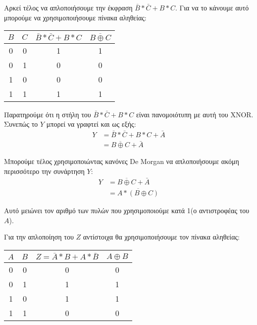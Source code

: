 \documentclass[]{article}
\begin{document}
Αρκεί τέλος να απλοποιήσουμε την έκφραση $\bar{B} * \bar{C} + B * C$. Για να το κάνουμε αυτό μπορούμε να χρησιμοποιήσουμε πίνακα αληθείας:
\begin{center}
	\begin{tabular} {|c|c|c|c|}
		\hline \rule{0pt}{11pt}$B$ & $C$ & $\bar{B} * \bar{C} + B * C$ & $\overline{B \oplus C}$ \\
		\hline 0                   & 0   & 1                           & 1                       \\
		0                          & 1   & 0                           & 0                       \\
		1                          & 0   & 0                           & 0                       \\
		1                          & 1   & 1                           & 1                       \\
		\hline
	\end{tabular}
\end{center}

Παρατηρούμε ότι η στήλη του $\bar{B} * \bar{C} + B * C$ είναι πανομοιότυπη με αυτή του XNOR. Συνεπώς το $Y$ μπορεί να γραφτεί και ως εξής:
\begin{align*}
	Y & = \bar{B} * \bar{C} + B * C + \bar{A} \\
	  & = \overline{B \oplus C} + \bar{A}
\end{align*}

Μπορούμε τέλος χρησιμοποιώντας κανόνες De Morgan να απλοποιήσουμε ακόμη περισσότερο την συνάρτηση $Y$:
\begin{align*}
	Y & = \overline{B \oplus C} + \bar{A} \\
	  & = \overline{A * (B \oplus C)}
\end{align*}

Αυτό μειώνει τον αριθμό των πυλών που χρησιμοποιούμε κατά 1(ο αντιστροφέας του $A$).

Για την απλοποίηση του $Z$ αντίστοιχα θα χρησιμοποιήσουμε τον πίνακα αληθείας:
\begin{center}
	\begin{tabular} {|c|c|c|c|}
		\hline \rule{0pt}{11pt}$A$ & $B$ & $Z = \bar{A} * B + A * \bar{B}$ & $A \oplus B$ \\
		\hline 0                   & 0   & 0                               & 0            \\
		0                          & 1   & 1                               & 1            \\
		1                          & 0   & 1                               & 1            \\
		1                          & 1   & 0                               & 0            \\
		\hline
	\end{tabular}
\end{center}
\end{document}
